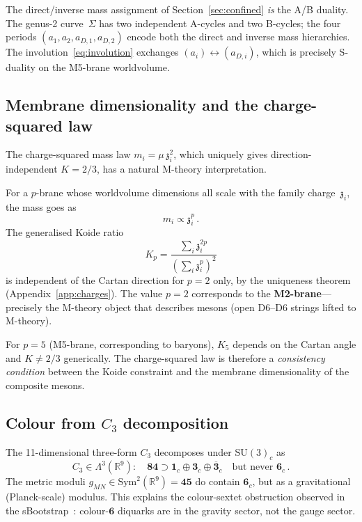 \documentclass[aps,prd,twocolumn,showpacs,preprintnumbers,superscriptaddress,floatfix]{revtex4-2}
\newcommand{\SU}{\mathrm{SU}}
\newcommand{\zch}{\mathfrak{z}}
\begin{document}
The direct/inverse mass assignment of Section~\ref{sec:confined}
\emph{is} the A/B duality.
The genus-2 curve~$\Sigma$ has two independent A-cycles and two
B-cycles; the four periods $(a_1, a_2, a_{D,1}, a_{D,2})$
encode both the direct and inverse mass hierarchies.
The involution~\eqref{eq:involution} exchanges $(a_i) \leftrightarrow
(a_{D,i})$, which is precisely S-duality on the M5-brane
worldvolume.


\subsection{Membrane dimensionality and the charge-squared law}

The charge-squared mass law $m_i = \mu\,\zch_i^2$, which uniquely
gives direction-independent $K = 2/3$, has a natural M-theory
interpretation.

For a $p$-brane whose worldvolume dimensions all scale with the
family charge~$\zch_i$, the mass goes as~\cite{Townsend:1995}
\begin{equation}
  m_i \propto \zch_i^p\,.
\end{equation}
The generalised Koide ratio
\begin{equation}
  K_p
  = \frac{\sum_i \zch_i^{2p}}{(\sum_i \zch_i^p)^2}
\end{equation}
is independent of the Cartan direction for $p = 2$ only, by the
uniqueness theorem (Appendix~\ref{app:charges}).
The value $p = 2$ corresponds to the \textbf{M2-brane}---precisely
the M-theory object that describes mesons (open D6--D6 strings
lifted to M-theory).

For $p = 5$ (M5-brane, corresponding to baryons), $K_5$ depends
on the Cartan angle and $K \neq 2/3$ generically.
The charge-squared law is therefore a \emph{consistency condition}
between the Koide constraint and the membrane dimensionality of the
composite mesons.


\subsection{Colour from $C_3$ decomposition}

The 11-dimensional three-form $C_3$ decomposes under $\SU(3)_c$ as
\begin{equation}
  C_3 \in \Lambda^3(\mathbb{R}^9):
  \quad \mathbf{84} \supset \mathbf{1}_c \oplus \mathbf{3}_c
  \oplus \overline{\mathbf{3}}_c
  \quad\text{but never } \mathbf{6}_c\,.
  \label{eq:C3_decomp}
\end{equation}
The metric moduli $g_{MN} \in \mathrm{Sym}^2(\mathbb{R}^9) =
\mathbf{45}$ do contain $\mathbf{6}_c$, but as a gravitational
(Planck-scale) modulus.
This explains the colour-sextet obstruction observed in the
sBootstrap~\cite{Rivero:2024epjc}: colour-$\mathbf{6}$
diquarks are in the gravity sector, not the gauge sector.
\end{document}
